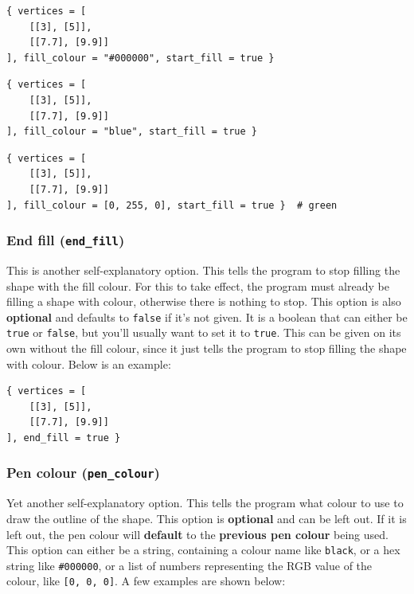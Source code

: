 \documentclass[11pt]{article}
\begin{document}
\begin{verbatim}
{ vertices = [
    [[3], [5]],
    [[7.7], [9.9]]
], fill_colour = "#000000", start_fill = true }
\end{verbatim}

\begin{verbatim}
{ vertices = [
    [[3], [5]],
    [[7.7], [9.9]]
], fill_colour = "blue", start_fill = true }
\end{verbatim}

\begin{verbatim}
{ vertices = [
    [[3], [5]],
    [[7.7], [9.9]]
], fill_colour = [0, 255, 0], start_fill = true }  # green
\end{verbatim}

\subsubsection{End fill (\texttt{end\_fill})}
\label{sec:orgaeed454}
This is another self-explanatory option. This tells the program to stop filling the shape with the fill colour. For this to take effect, the program must already be filling a shape with colour, otherwise there is nothing to stop. This option is also \textbf{optional} and defaults to \texttt{false} if it's not given. It is a boolean that can either be \texttt{true} or \texttt{false}, but you'll usually want to set it to \texttt{true}. This can be given on its own without the fill colour, since it just tells the program to stop filling the shape with colour. Below is an example:

\begin{verbatim}
{ vertices = [
    [[3], [5]],
    [[7.7], [9.9]]
], end_fill = true }
\end{verbatim}

\subsubsection{Pen colour (\texttt{pen\_colour})}
\label{sec:org36bb29c}
Yet another self-explanatory option. This tells the program what colour to use to draw the outline of the shape. This option is \textbf{optional} and can be left out. If it is left out, the pen colour will \textbf{default} to the \textbf{previous pen colour} being used. This option can either be a string, containing a colour name like \texttt{black}, or a hex string like \texttt{\#000000}, or a list of numbers representing the RGB value of the colour, like \texttt{[0, 0, 0]}. A few examples are shown below:
\end{document}
